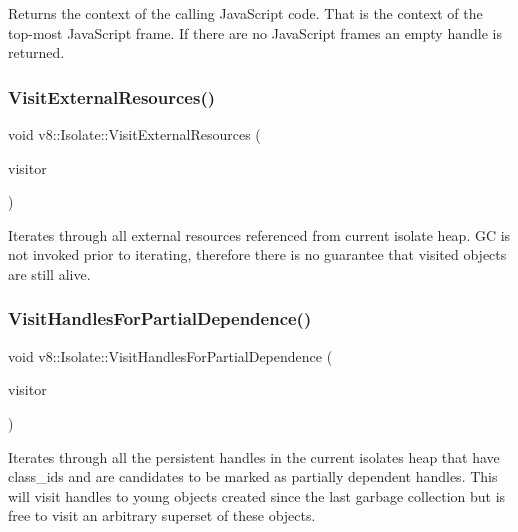 Returns the context of the calling Java\+Script code. That is the context of the top-\/most Java\+Script frame. If there are no Java\+Script frames an empty handle is returned. \mbox{\label{classv8_1_1Isolate_a44d513b6426299de4c16e069958a723b}} 
\subsubsection{\texorpdfstring{Visit\+External\+Resources()}{VisitExternalResources()}}
{\footnotesize\ttfamily void v8\+::\+Isolate\+::\+Visit\+External\+Resources (\begin{DoxyParamCaption}\item[{\mbox{\hyperlink{classv8_1_1ExternalResourceVisitor}{External\+Resource\+Visitor}} $\ast$}]{visitor }\end{DoxyParamCaption})}

Iterates through all external resources referenced from current isolate heap. GC is not invoked prior to iterating, therefore there is no guarantee that visited objects are still alive. \mbox{\label{classv8_1_1Isolate_ac5a3ecbb7ef90476150a20904c522744}} 
\subsubsection{\texorpdfstring{Visit\+Handles\+For\+Partial\+Dependence()}{VisitHandlesForPartialDependence()}}
{\footnotesize\ttfamily void v8\+::\+Isolate\+::\+Visit\+Handles\+For\+Partial\+Dependence (\begin{DoxyParamCaption}\item[{\mbox{\hyperlink{classv8_1_1PersistentHandleVisitor}{Persistent\+Handle\+Visitor}} $\ast$}]{visitor }\end{DoxyParamCaption})}

Iterates through all the persistent handles in the current isolate\textquotesingle{}s heap that have class\+\_\+ids and are candidates to be marked as partially dependent handles. This will visit handles to young objects created since the last garbage collection but is free to visit an arbitrary superset of these objects. \mbox{\label{classv8_1_1Isolate_a8c60c4e0f61250a422ba2336dcd50a75}} 
